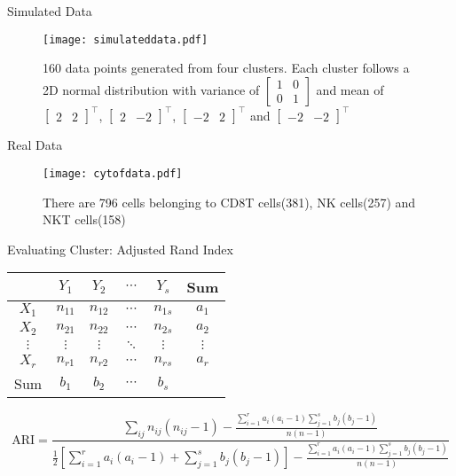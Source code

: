 \documentclass{beamer}
\begin{document}
	\begin{frame}
		\tableofcontents
		[
		currentsection,
		currentsubsection,
		subsectionstyle=show/shaded/hide
		]
	\end{frame}
	
	\begin{frame}{Simulated Data}
		\begin{figure}[htbp]
			\centering
			\texttt{[image: simulateddata.pdf]}
			\caption*{160 data points generated from four clusters. Each cluster follows a 2D normal distribution with variance of $\begin{bmatrix} 1&0\\0&1 \end{bmatrix}$ and mean of $\begin{bmatrix}2&2 \end{bmatrix}^\top$, $\begin{bmatrix}2&-2 \end{bmatrix}^\top$, $\begin{bmatrix}-2&2 \end{bmatrix}^\top$ and $\begin{bmatrix}-2&-2 \end{bmatrix}^\top$}
		\end{figure}
	\end{frame}
	
	\begin{frame}{Real Data}
		\begin{figure}[htbp]
			\centering
			\texttt{[image: cytofdata.pdf]}
			\caption*{There are 796 cells belonging to CD8T cells(381), NK cells(257) and NKT cells(158)}
		\end{figure}
	\end{frame}
	
	\begin{frame}{Evaluating Cluster: Adjusted Rand Index}
		\begin{table}[htbp]
			\centering
			\begin{tabular}{c|c|c|c|c|c}
			 & $Y_1$ & $Y_2$ & $\cdots$ & $Y_s$ & Sum \\
			 \hline
			 $X_1$ & $n_{11}$ & $n_{12}$ & $\cdots$ & $n_{1s}$ & $a_{1}$ \\
			 \hline
			 $X_{2}$ & $n_{21}$ & $n_{22}$ & $\cdots$ & $n_{2s}$ & $a_{2}$\\
			 \hline
			 $\vdots$ & $\vdots$ & $\vdots$ & $\ddots$ & $\vdots$ & $\vdots$\\
			 \hline
			 $X_{r}$ & $n_{r1}$ & $n_{r2}$ & $\cdots$ & $n_{rs}$ & $a_{r}$\\
			 \hline
			Sum & $b_{1}$ & $b_{2}$ & $\cdots$ & $b_{s}$ &
			\end{tabular}
		\end{table}
		\small
		$$ \text{ARI} = \frac{\sum_{ij} n_{ij} (n_{ij}-1) -  \frac{ \sum_{i=1}^{r}a_{i}(a_{i}-1) \sum_{j=1}^{s}b_{j}(b_{j} - 1) }{n(n-1)} } {\frac{1}{2}\left[ \sum_{i=1}^{r}a_{i}(a_{i}-1) + \sum_{j=1}^{s}b_{j}(b_{j}-1) \right] -   \frac{ \sum_{i=1}^{r}a_{i}(a_{i}-1) \sum_{j=1}^{s}b_{j}(b_{j} - 1) }{n(n-1)} }  $$
	\end{frame}
	
\end{document}
